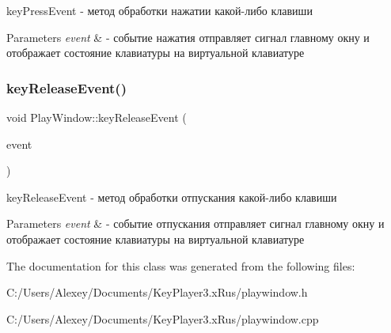 key\+Press\+Event -\/ метод обработки нажатии какой-\/либо клавиши 


\begin{DoxyParams}{Parameters}
{\em event} & -\/ событие нажатия отправляет сигнал главному окну и отображает состояние клавиатуры на виртуальной клавиатуре \\
\hline
\end{DoxyParams}
\mbox{\label{class_play_window_a0812a60414cc058a491d65b9ed919f5f}} 
\subsubsection{\texorpdfstring{key\+Release\+Event()}{keyReleaseEvent()}}
{\footnotesize\ttfamily void Play\+Window\+::key\+Release\+Event (\begin{DoxyParamCaption}\item[{Q\+Key\+Event $\ast$}]{event }\end{DoxyParamCaption})\hspace{0.3cm}{\ttfamily [protected]}}



key\+Release\+Event -\/ метод обработки отпускания какой-\/либо клавиши 


\begin{DoxyParams}{Parameters}
{\em event} & -\/ событие отпускания отправляет сигнал главному окну и отображает состояние клавиатуры на виртуальной клавиатуре \\
\hline
\end{DoxyParams}


The documentation for this class was generated from the following files\+:\begin{DoxyCompactItemize}
\item 
C\+:/\+Users/\+Alexey/\+Documents/\+Key\+Player3.\+x\+Rus/playwindow.\+h\item 
C\+:/\+Users/\+Alexey/\+Documents/\+Key\+Player3.\+x\+Rus/playwindow.\+cpp\end{DoxyCompactItemize}
